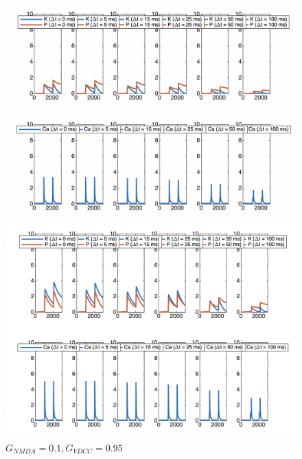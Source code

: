 \documentclass{article}
\begin{document}
\begin{figure}[h]
    \centering
    \begin{minipage}[b]{0.45\textwidth}
        \includegraphics[width=1.1\textwidth]{0.1.png}
        \caption{$G_{NMDA}=0.2,G_{VDCC}=1.3$}
        \label{fig:image1}
    \end{minipage}
    \hfill %
    \begin{minipage}[b]{0.45\textwidth}
        \includegraphics[width=\textwidth]{0.3.png}
        \caption{$G_{NMDA}=0.1,G_{VDCC}=0.95$}
        \label{fig:image2}
    \end{minipage}
\end{figure}\\
\end{document}
